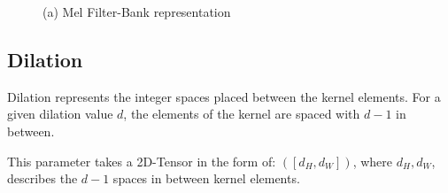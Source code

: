 \begin{figure}[H]
    \centering
    \caption{(a) Mel Filter-Bank representation}
\end{figure}

\subsection*{Dilation}
Dilation represents the integer spaces placed between the kernel elements.
For a given dilation value \(d\),
the elements of the kernel are spaced with \(d - 1\) in between.

This parameter takes a 2D-Tensor in the form of:
\( \left( \left[ d_{H}, d_{W} \right] \right) \),
where \( d_{H}, d_{W} \),
describes the \(d - 1 \) spaces in between kernel elements.


